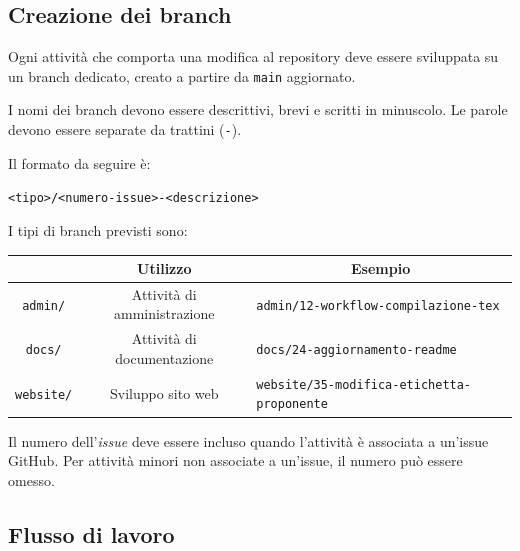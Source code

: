 \documentclass[11pt, a4paper]{article}
\begin{document}
\subsection{Creazione dei branch}
\label{subsec:creazione-dei-branch}

Ogni attività che comporta una modifica al repository deve essere sviluppata su un branch dedicato, creato a partire da \texttt{main} aggiornato.

I nomi dei branch devono essere descrittivi, brevi e scritti in minuscolo. Le parole devono essere separate da trattini (\texttt{-}).

Il formato da seguire è:

\noindent \texttt{<tipo>/<numero-issue>-<descrizione>}

I tipi di branch previsti sono:

\begin{center}
    \renewcommand{\arraystretch}{1.5}
    \begin{tabularx}{\textwidth}{|c|c|X|}
        \hline
        \rowcolor{gray!10} 
        \multicolumn{1}{|c|}{\textbf{Tipo}} & 
        \multicolumn{1}{c|}{\textbf{Utilizzo}} & 
        \multicolumn{1}{c|}{\textbf{Esempio}} \\
        \hline
        \texttt{admin/} & Attività di amministrazione & \texttt{admin/12-workflow-compilazione-tex}\\
        \hline
        \texttt{docs/} & Attività di documentazione & \texttt{docs/24-aggiornamento-readme}\\
        \hline
        \texttt{website/} & Sviluppo sito web & \texttt{website/35-modifica-etichetta-proponente}\\
        \hline
    \end{tabularx}
\end{center}

Il numero dell'\textit{issue} deve essere incluso quando l'attività è associata a un'issue GitHub. Per attività minori non associate a un'issue, il numero può essere omesso.

\subsection{Flusso di lavoro}
\end{document}

